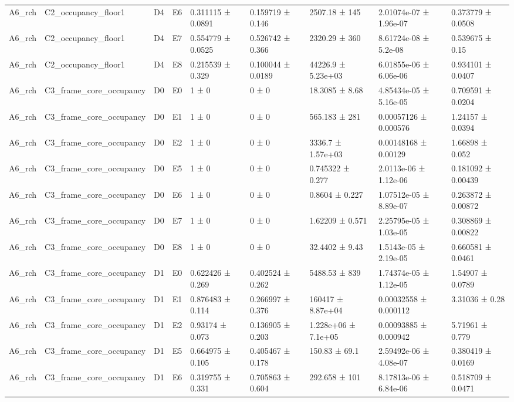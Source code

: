 \begin{table}
\begin{tabular}{lllllllll}
A6\_rch & C2\_occupancy\_floor1 & D4 & E6 & 0.311115 ± 0.0891 & 0.159719 ± 0.146 & 2507.18 ± 145 & 2.01074e-07 ± 1.96e-07 & 0.373779 ± 0.0508 \\
A6\_rch & C2\_occupancy\_floor1 & D4 & E7 & 0.554779 ± 0.0525 & 0.526742 ± 0.366 & 2320.29 ± 360 & 8.61724e-08 ± 5.2e-08 & 0.539675 ± 0.15 \\
A6\_rch & C2\_occupancy\_floor1 & D4 & E8 & 0.215539 ± 0.329 & 0.100044 ± 0.0189 & 44226.9 ± 5.23e+03 & 6.01855e-06 ± 6.06e-06 & 0.934101 ± 0.0407 \\
A6\_rch & C3\_frame\_core\_occupancy & D0 & E0 & 1 ± 0 & 0 ± 0 & 18.3085 ± 8.68 & 4.85434e-05 ± 5.16e-05 & 0.709591 ± 0.0204 \\
A6\_rch & C3\_frame\_core\_occupancy & D0 & E1 & 1 ± 0 & 0 ± 0 & 565.183 ± 281 & 0.00057126 ± 0.000576 & 1.24157 ± 0.0394 \\
A6\_rch & C3\_frame\_core\_occupancy & D0 & E2 & 1 ± 0 & 0 ± 0 & 3336.7 ± 1.57e+03 & 0.00148168 ± 0.00129 & 1.66898 ± 0.052 \\
A6\_rch & C3\_frame\_core\_occupancy & D0 & E5 & 1 ± 0 & 0 ± 0 & 0.745322 ± 0.277 & 2.0113e-06 ± 1.12e-06 & 0.181092 ± 0.00439 \\
A6\_rch & C3\_frame\_core\_occupancy & D0 & E6 & 1 ± 0 & 0 ± 0 & 0.8604 ± 0.227 & 1.07512e-05 ± 8.89e-07 & 0.263872 ± 0.00872 \\
A6\_rch & C3\_frame\_core\_occupancy & D0 & E7 & 1 ± 0 & 0 ± 0 & 1.62209 ± 0.571 & 2.25795e-05 ± 1.03e-05 & 0.308869 ± 0.00822 \\
A6\_rch & C3\_frame\_core\_occupancy & D0 & E8 & 1 ± 0 & 0 ± 0 & 32.4402 ± 9.43 & 1.5143e-05 ± 2.19e-05 & 0.660581 ± 0.0461 \\
A6\_rch & C3\_frame\_core\_occupancy & D1 & E0 & 0.622426 ± 0.269 & 0.402524 ± 0.262 & 5488.53 ± 839 & 1.74374e-05 ± 1.12e-05 & 1.54907 ± 0.0789 \\
A6\_rch & C3\_frame\_core\_occupancy & D1 & E1 & 0.876483 ± 0.114 & 0.266997 ± 0.376 & 160417 ± 8.87e+04 & 0.00032558 ± 0.000112 & 3.31036 ± 0.28 \\
A6\_rch & C3\_frame\_core\_occupancy & D1 & E2 & 0.93174 ± 0.073 & 0.136905 ± 0.203 & 1.228e+06 ± 7.1e+05 & 0.00093885 ± 0.000942 & 5.71961 ± 0.779 \\
A6\_rch & C3\_frame\_core\_occupancy & D1 & E5 & 0.664975 ± 0.105 & 0.405467 ± 0.178 & 150.83 ± 69.1 & 2.59492e-06 ± 4.08e-07 & 0.380419 ± 0.0169 \\
A6\_rch & C3\_frame\_core\_occupancy & D1 & E6 & 0.319755 ± 0.331 & 0.705863 ± 0.604 & 292.658 ± 101 & 8.17813e-06 ± 6.84e-06 & 0.518709 ± 0.0471 \\

\end{tabular}
\end{table}
